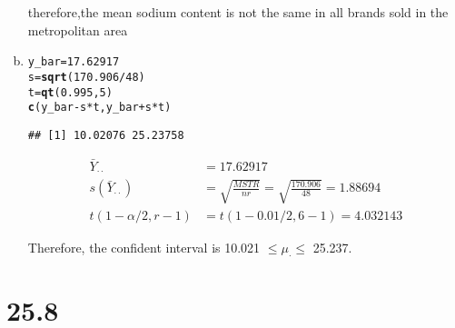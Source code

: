 \documentclass{article}\usepackage[]{graphicx}\usepackage[]{color}
\makeatletter
\newcommand{\hlnum}[1]{\textcolor[rgb]{0.686,0.059,0.569}{#1}}%
\newcommand{\hlopt}[1]{\textcolor[rgb]{0,0,0}{#1}}%
\newcommand{\hlstd}[1]{\textcolor[rgb]{0.345,0.345,0.345}{#1}}%
\newcommand{\hlkwb}[1]{\textcolor[rgb]{0.69,0.353,0.396}{#1}}%
\newcommand{\hlkwd}[1]{\textcolor[rgb]{0.737,0.353,0.396}{\textbf{#1}}}%
\newenvironment{kframe}{%
 \def\at@end@of@kframe{}%
 \ifinner\ifhmode%
  \def\at@end@of@kframe{\end{minipage}}%
  \begin{minipage}{\columnwidth}%
 \fi\fi%
 \def\FrameCommand##1{\hskip\@totalleftmargin \hskip-\fboxsep
 \colorbox{shadecolor}{##1}\hskip-\fboxsep
     \hskip-\linewidth \hskip-\@totalleftmargin \hskip\columnwidth}%
 \MakeFramed {\advance\hsize-\width
   \@totalleftmargin\z@ \linewidth\hsize
   \@setminipage}}%
 {\par\unskip\endMakeFramed%
 \at@end@of@kframe}
\newenvironment{knitrout}{}{} %
\makeatother
\begin{document}
\begin{enumerate}[(a)]
\begin{center}
therefore,the mean sodium content is not the same in all brands sold in the metropolitan area
\end{center}

\item

\begin{knitrout}
\color{fgcolor}\begin{kframe}
\begin{alltt}
  \hlstd{y_bar} \hlkwb{=} \hlnum{17.62917}
  \hlstd{s} \hlkwb{=} \hlkwd{sqrt}\hlstd{(}\hlnum{170.906}\hlopt{/}\hlnum{48}\hlstd{)}
  \hlstd{t} \hlkwb{=} \hlkwd{qt}\hlstd{(}\hlnum{0.995}\hlstd{,}\hlnum{5}\hlstd{)}
  \hlkwd{c}\hlstd{(y_bar}\hlopt{-}\hlstd{s}\hlopt{*}\hlstd{t, y_bar}\hlopt{+}\hlstd{s}\hlopt{*}\hlstd{t)}
\end{alltt}
\begin{verbatim}
## [1] 10.02076 25.23758
\end{verbatim}
\end{kframe}
\end{knitrout}

\begin{displaymath}
\begin{split}
\bar{Y}_{\cdot\cdot}&=17.62917\\
s(\bar{Y}_{\cdot\cdot})&=\sqrt{\frac{MSTR}{nr}}=\sqrt{\frac{170.906}{48}}=1.88694\\
t(1-\alpha/2,r-1)&=t(1-0.01/2,6-1)=4.032143
\end{split}
\end{displaymath}

Therefore, the confident interval is 10.021 $\leq \mu_{\cdot} \leq$ 25.237. 

\end{enumerate}

\section {25.8}
\end{document}
